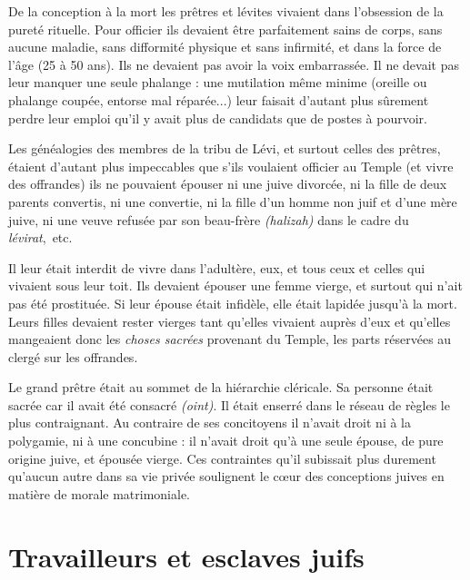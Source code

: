  De la conception à la mort les prêtres et lévites vivaient dans l'obsession de la pureté rituelle. Pour officier ils devaient être parfaitement sains de corps, sans aucune maladie, sans difformité physique et sans infirmité, et dans la force de l'âge (25 à 50 ans). Ils ne devaient pas avoir la voix embarrassée. Il ne devait pas leur manquer une seule phalange : une mutilation même minime (oreille ou phalange coupée, entorse mal réparée...) leur faisait d'autant plus sûrement perdre leur emploi qu'il y avait plus de candidats que de postes à pourvoir. 

 Les généalogies des membres de la tribu de Lévi, et surtout celles des prêtres, étaient d'autant plus impeccables que s'ils voulaient officier au Temple (et vivre des offrandes) ils ne pouvaient épouser ni une juive divorcée, ni la fille de deux parents convertis, ni une convertie, ni la fille d'un homme non juif et d'une mère juive, ni une veuve refusée par son beau-frère \emph{(halizah)} dans le cadre du \emph{lévirat},~etc. 

 Il leur était interdit de vivre dans l'adultère, eux, et tous ceux et celles qui vivaient sous leur toit. Ils devaient épouser une femme vierge, et surtout qui n'ait pas été prostituée. Si leur épouse était infidèle, elle était lapidée jusqu'à la mort. Leurs filles devaient rester vierges tant qu'elles vivaient auprès d'eux et qu'elles mangeaient donc les \emph{choses sacrées} provenant du Temple, les parts réservées au clergé sur les offrandes. 

 Le grand prêtre était au sommet de la hiérarchie cléricale. Sa personne était sacrée car il avait été consacré \emph{(oint)}. Il était enserré dans le réseau de règles le plus contraignant. Au contraire de ses concitoyens il n'avait droit ni à la polygamie, ni à une concubine : il n'avait droit qu'à une seule épouse, de pure origine juive, et épousée vierge. Ces contraintes qu'il subissait plus durement qu'aucun autre dans sa vie privée soulignent le cœur des conceptions juives en matière de morale matrimoniale.
 
 \section{Travailleurs et esclaves juifs}

